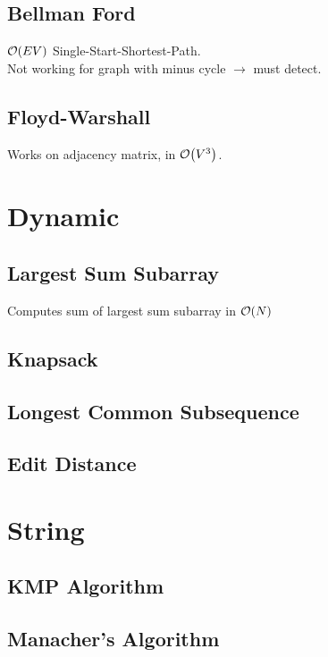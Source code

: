 \documentclass[landscape,8pt]{article}
\begin{document}
\begin{multicols}{2}
  \subsection{Bellman Ford}
    $\order{EV}$ Single-Start-Shortest-Path.\\
    Not working for graph with minus cycle $\rightarrow$ must detect.
      

  \subsection{Floyd-Warshall}
    Works on adjacency matrix, in $\order{V^3}$.
      

\section{Dynamic}
  \subsection{Largest Sum Subarray}
  Computes sum of largest sum subarray in $\order{N}$
    

  \subsection{Knapsack}

  \subsection{Longest Common Subsequence}
    
  \subsection{Edit Distance}

\section{String}
  \subsection{KMP Algorithm}

  \subsection{Manacher's Algorithm}


\end{multicols}
\end{document}
